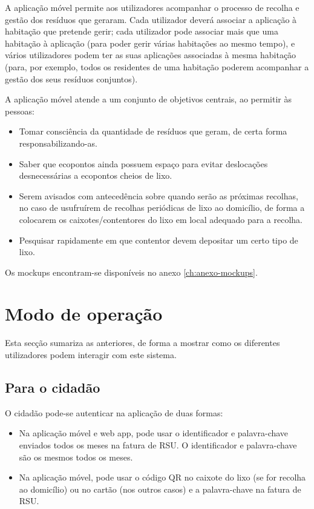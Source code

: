 \documentclass[11pt, a4paper, oneside]{book}
\begin{document}
A aplicação móvel permite aos utilizadores acompanhar o processo de recolha e gestão dos resíduos que geraram. Cada utilizador deverá associar a aplicação à habitação que pretende gerir; cada utilizador pode associar mais que uma habitação à aplicação (para poder gerir várias habitações ao mesmo tempo), e vários utilizadores podem ter as suas aplicações associadas à mesma habitação (para, por exemplo, todos os residentes de uma habitação poderem acompanhar a gestão dos seus resíduos conjuntos).

A aplicação móvel atende a um conjunto de objetivos centrais, ao permitir às pessoas:
\begin{itemize}
    \itemsep0em
    \item Tomar consciência da quantidade de resíduos que geram, de certa forma responsabilizando-as.
    \item Saber que ecopontos ainda possuem espaço para evitar deslocações desnecessárias a ecopontos cheios de lixo.
    \item Serem avisados com antecedência sobre quando serão as próximas recolhas, no caso de usufruírem de recolhas periódicas de lixo ao domicílio, de forma a colocarem os caixotes/contentores do lixo em local adequado para a recolha.
    \item Pesquisar rapidamente em que contentor devem depositar um certo tipo de lixo.
\end{itemize}

Os mockups encontram-se disponíveis no anexo \ref{ch:anexo-mockups}.

\newpage

\section{Modo de operação}

Esta secção sumariza as anteriores, de forma a mostrar como os diferentes utilizadores podem interagir com este sistema.

\subsection{Para o cidadão}

O cidadão pode-se autenticar na aplicação de duas formas:
\begin{itemize}
    \itemsep0em
    \item Na aplicação móvel e web app, pode usar o identificador e palavra-chave enviados todos os meses na fatura de RSU. O identificador e palavra-chave são os mesmos todos os meses.
    \item Na aplicação móvel, pode usar o código QR no caixote do lixo (se for recolha ao domicílio) ou no cartão (nos outros casos) e a palavra-chave na fatura de RSU.
\end{itemize}
\end{document}
